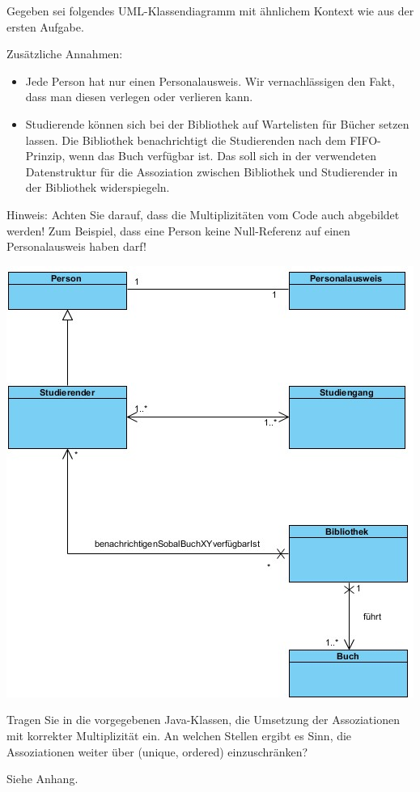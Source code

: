 \documentclass{abgabe}
\begin{document}
\begin{questions}

    Gegeben sei folgendes UML-Klassendiagramm mit ähnlichem Kontext wie aus der ersten Aufgabe.

    Zusätzliche Annahmen:
    \begin{itemize}
        \item Jede Person hat nur einen Personalausweis.
              Wir vernachlässigen den Fakt, dass man diesen verlegen oder verlieren kann.
        \item Studierende können sich bei der Bibliothek auf Wartelisten für Bücher setzen lassen.
              Die Bibliothek benachrichtigt die Studierenden nach dem FIFO-Prinzip, wenn das Buch verfügbar ist.
              Das soll sich in der verwendeten Datenstruktur für die Assoziation zwischen Bibliothek und Studierender in der Bibliothek widerspiegeln.
    \end{itemize}

    Hinweis: Achten Sie darauf, dass die Multiplizitäten vom Code auch abgebildet werden! Zum Beispiel, dass eine Person keine Null-Referenz auf einen Personalausweis haben darf!

    \begin{center}
        \includegraphics[width=.5\textwidth]{swt_h07_muster.jpg}
    \end{center}

    Tragen Sie in die vorgegebenen Java-Klassen, die Umsetzung der Assoziationen mit korrekter Multiplizität ein. An welchen Stellen ergibt es Sinn, die Assoziationen weiter über (unique, ordered) einzuschränken?
    \begin{solution}
        Siehe Anhang.
    \end{solution}
\end{questions}
\end{document}
